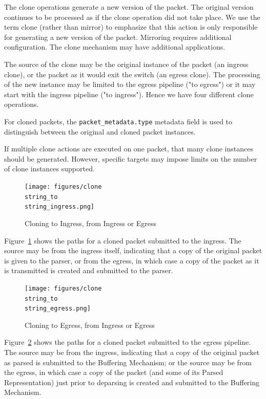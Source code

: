 \documentclass[12pt]{article}
\begin{document}

The clone operations generate a new version of the packet. The original version 
continues to be processed as if the clone operation did not take place. We 
use the term clone (rather than mirror) to emphasize that this action is only 
responsible for generating a new version of the packet. Mirroring requires 
additional configuration. The clone mechanism may have additional applications. 

The source of the clone may be the original instance of the packet (an ingress 
clone), or the packet as it would exit the switch (an egress clone). The processing 
of the new instance may be limited to the egress pipeline ("to egress") or 
it may start with the ingress pipeline ("to ingress").  Hence we have four 
different clone operations.

For cloned packets, the \texttt{packet_metadata.type} metadata field is used to
distinguish  between the original and cloned packet instances.

If multiple clone actions are executed on one packet, that many clone instances 
should be generated.  However, specific targets may impose limits on the number 
of clone instances supported.

\begin{figure}[h!]
    \centering
    \texttt{[image: figures/clone\\string\_to\\string\_ingress.png]}
    \caption{Cloning to Ingress, from Ingress or Egress}
    \label{fig:ingressclone}
\end{figure}

Figure~\ref{fig:ingressclone} shows the paths for a cloned packet submitted to the ingress.  The 
source may be from the ingress itself, indicating that a copy of the original 
packet is given to the parser, or from the egress, in which case a copy of 
the packet as it is transmitted is created and submitted to the parser. 

\begin{figure}[h!]
    \centering
    \texttt{[image: figures/clone\\string\_to\\string\_egress.png]}
    \caption{Cloning to Egress, from Ingress or Egress}
    \label{fig:egressclone}
\end{figure}

Figure~\ref{fig:egressclone} shows the paths for a cloned packet submitted to the egress pipeline. 
 The source may be from the ingress, indicating that a copy of the original 
packet as parsed is submitted to the Buffering Mechanism; or the source may 
be from the egress, in which case a copy of the packet (and some of its Parsed 
Representation) just prior to deparsing is created and submitted to the Buffering 
Mechanism. 
\end{document}
